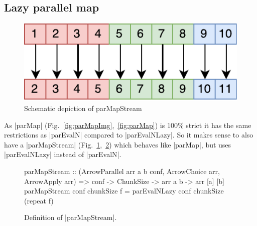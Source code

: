 \subsection{Lazy parallel map}
\begin{figure}[h]
	\includegraphics[scale=0.7]{images/parMapStream}
	\caption{Schematic depiction of parMapStream}
	\label{fig:parMapStreamImg}
\end{figure}
As |parMap| (Fig.~\ref{fig:parMapImg},~\ref{fig:parMap}) is 100\% strict it has the same restrictions as |parEvalN| compared to |parEvalNLazy|. So it makes sense to also have a |parMapStream| (Fig.~\ref{fig:parMapStreamImg},~\ref{fig:parMapStream}) which behaves like |parMap|, but uses |parEvalNLazy| instead of |parEvalN|.
\begin{figure}[h]
\begin{code}
parMapStream :: (ArrowParallel arr a b conf, ArrowChoice arr, ArrowApply arr) =>
	conf -> ChunkSize -> arr a b -> arr [a] [b]
parMapStream conf chunkSize f = parEvalNLazy conf chunkSize (repeat f)
\end{code}
\caption{Definition of |parMapStream|.}
\label{fig:parMapStream}
\end{figure}

